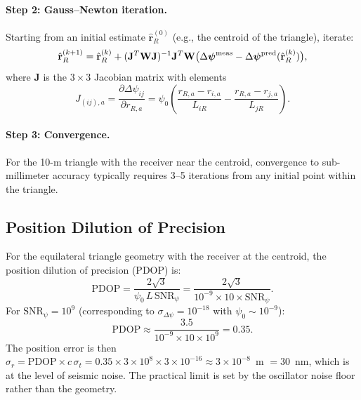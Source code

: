 \documentclass[12pt,letterpaper]{article}
\begin{document}
\paragraph{Step 2: Gauss--Newton iteration.}
Starting from an initial estimate $\hat{\mathbf{r}}_R^{(0)}$ (e.g., the
centroid of the triangle), iterate:
\begin{equation}
\hat{\mathbf{r}}_R^{(k+1)} = \hat{\mathbf{r}}_R^{(k)}
+ (\mathbf{J}^T\mathbf{W}\mathbf{J})^{-1}\mathbf{J}^T\mathbf{W}
\bigl(\Delta\boldsymbol{\psi}^{\rm meas}
- \Delta\boldsymbol{\psi}^{\rm pred}(\hat{\mathbf{r}}_R^{(k)})\bigr),
\end{equation}
where $\mathbf{J}$ is the $3\times3$ Jacobian matrix with elements
\begin{equation}
J_{(ij),a} = \frac{\partial\Delta\psi_{ij}}{\partial r_{R,a}}
= \psi_0\left(\frac{r_{R,a} - r_{i,a}}{L_{iR}}
- \frac{r_{R,a} - r_{j,a}}{L_{jR}}\right).
\end{equation}

\paragraph{Step 3: Convergence.}
For the 10-m triangle with the receiver near the centroid, convergence
to sub-millimeter accuracy typically requires 3--5 iterations from
any initial point within the triangle.

\subsection{Position Dilution of Precision}

For the equilateral triangle geometry with the receiver at the centroid,
the position dilution of precision (PDOP) is:
\begin{equation}
\text{PDOP} = \frac{2\sqrt{3}}{\psi_0\,L\,\text{SNR}_\psi}
= \frac{2\sqrt{3}}{10^{-9}\times 10\times \text{SNR}_\psi}.
\end{equation}
For $\text{SNR}_\psi = 10^9$ (corresponding to $\sigma_{\Delta\psi} = 10^{-18}$
with $\psi_0 \sim 10^{-9}$):
\begin{equation}
\text{PDOP} \approx \frac{3.5}{10^{-9}\times 10\times 10^9} = 0.35.
\end{equation}
The position error is then
$\sigma_r = \text{PDOP}\times c\,\sigma_t = 0.35\times 3\times10^8
\times 3\times10^{-16} \approx 3\times10^{-8}$~m $= 30$~nm, which is
at the level of seismic noise. The practical limit is set by the
oscillator noise floor rather than the geometry.
\end{document}
